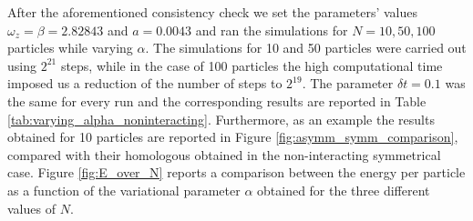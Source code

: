 After the aforementioned consistency check we set the parameters' values $\omega_z = \beta = 2.82843$ and $a = 0.0043$ and ran the simulations for $N=10,50,100$ particles while varying $\alpha$. The simulations for 10 and 50 particles were carried out using $2^{21}$ steps, while in the case of 100 particles the high computational time imposed us a reduction of the number of steps to $2^{19}$. The parameter $\delta t = 0.1$ was the same for every run and the corresponding results are reported in Table \ref{tab:varying_alpha_noninteracting}. Furthermore, as an example the results obtained for 10 particles are reported in Figure \ref{fig:asymm_symm_comparison}, compared with their homologous obtained in the non-interacting symmetrical case. Figure \ref{fig:E_over_N} reports a comparison between the energy per particle as a function of the variational parameter $\alpha$ obtained for the three different values of $N$. \\



